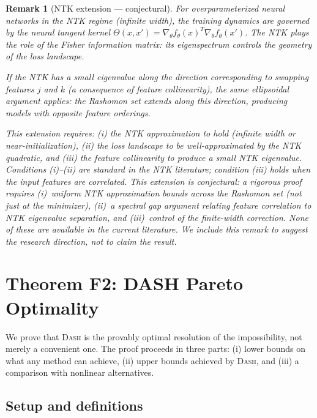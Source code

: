 \documentclass{article}
\newcommand{\DASH}{\textsc{Dash}}
\newtheorem{remark}[theorem]{Remark}
\begin{document}
\begin{remark}[NTK extension --- conjectural]
For overparameterized neural networks in the NTK regime
(infinite width), the training dynamics are governed by the
neural tangent kernel $\Theta(x, x') = \nabla_\theta f_\theta(x)^T
\nabla_\theta f_\theta(x')$. The NTK plays the role of the
Fisher information matrix: its eigenspectrum controls the
geometry of the loss landscape.

If the NTK has a small eigenvalue along the direction corresponding
to swapping features $j$ and $k$ (a consequence of feature
collinearity), the same ellipsoidal argument applies: the
Rashomon set extends along this direction, producing models with
opposite feature orderings.

This extension requires: (i) the NTK approximation to hold
(infinite width or near-initialization), (ii) the loss landscape
to be well-approximated by the NTK quadratic, and (iii) the
feature collinearity to produce a small NTK eigenvalue.
Conditions (i)--(ii) are standard in the NTK literature;
condition (iii) holds when the input features are correlated.
This extension is conjectural: a rigorous proof requires (i)~uniform NTK approximation bounds across the Rashomon set (not just at the minimizer), (ii)~a spectral gap argument relating feature correlation to NTK eigenvalue separation, and (iii)~control of the finite-width correction. None of these are available in the current literature. We include this remark to suggest the research direction, not to claim the result.
\end{remark}

\section{Theorem F2: DASH Pareto Optimality}

We prove that \DASH{} is the provably optimal resolution of the
impossibility, not merely a convenient one. The proof proceeds in three
parts: (i) lower bounds on what any method can achieve, (ii) upper
bounds achieved by \DASH{}, and (iii) a comparison with nonlinear
alternatives.

\subsection{Setup and definitions}
\end{document}
